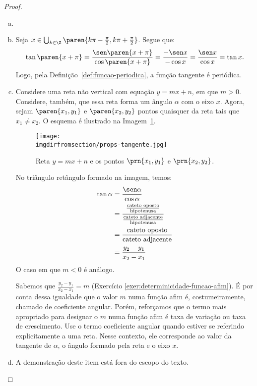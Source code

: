 \begin{proof}
  \begin{enumerate}[(a)]
    \item[]
    \item Seja $x \in \bigcup_{k \in \Z} \paren{k \pi - \frac{\pi} 2, k \pi + \frac {\pi} 2}$. 
  Segue que: $$\tan \paren{x+\pi} = \frac{\sen \paren{x+\pi}}{\cos \paren{x+\pi}}= \frac{-\sen x}{-\cos x}= \frac{\sen x}{\cos x}= \tan x.$$
  Logo, pela Definição~\ref{def:funcao-periodica}, a função tangente é periódica.
  \item Considere uma reta não vertical com equação $y=mx+n$, em que $m > 0$. 
  Considere, também, que essa reta forma um ângulo $\alpha$ com o eixo $x$. 
  Agora, sejam $\paren {x_1, y_1}$ e $\paren{x_2, y_2}$ pontos quaisquer da reta tais que $x_1 \neq x_2$. 
  O esquema é ilustrado na Imagem~\ref{img:prova-props-tangente}. 
  \begin{figure}[H]
      \centering
      \texttt{[image: \\imgdirfromsection/props-tangente.jpg]}
      \caption{Reta $y = mx + n$ e os pontos $\prn{x_1, y_1}$ e $\prn{x_2, y_2}$.}
      \label{img:prova-props-tangente}
  \end{figure}
  No triângulo retângulo formado na imagem, temos:
  \begin{align*}
    \tan \alpha &= \frac {\sen\alpha}{\cos\alpha} \\ 
    &= \frac{ \frac{\text{cateto oposto}}{\text{hipotenusa}}   }{\frac{\text{cateto adjacente}}{\text{hipotenusa}}} \\
    &= \frac{\text{cateto oposto}}{\text{cateto adjacente}}\\
    &= \frac{y_2 - y_1}{x_2 - x_1}
  \end{align*}
  O caso em que $m < 0$ é análogo.

  Sabemos que $\frac{y_2 - y_1}{x_2 - x_1} = m$ (Exercício \ref{exer:determinicidade-funcao-afim}).
  É por conta dessa igualdade que o valor $m$ numa função afim é, costumeiramente, chamado de coeficiente angular. Porém, reforçamos que o termo mais apropriado para designar o $m$ numa função afim é taxa de variação ou taxa de crescimento. Use o termo coeficiente angular quando estiver se referindo explicitamente a uma reta. Nesse contexto, ele corresponde ao valor da tangente de $\alpha$, o ângulo formado pela reta e o eixo $x$.
  \item A demonstração deste item está fora do escopo do texto.
  \end{enumerate}

  
\end{proof}